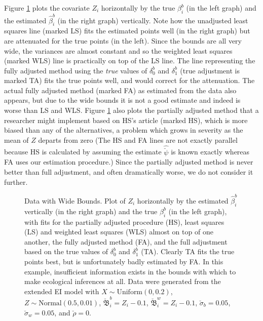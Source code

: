 \documentclass[11pt,titlepage]{article}
\newcommand{\bbeta}{{\mathfrak B}}
\newcommand{\sigmau}{\breve{\sigma}}
\newcommand{\rhou}{\breve{\rho}}
\newcommand{\psiu}{\breve{\psi}}
\begin{document}
Figure \ref{f:wide} plots the covariate $Z_i$ horizontally by the true
$\beta_i^b$ (in the left graph) and the estimated $\hat\beta_i^b$ (in
the right graph) vertically.  Note how the unadjusted least squares
line (marked LS) fits the estimated points well (in the right graph)
but are attenuated for the true points (in the left).  Since the
bounds are all very wide, the variances are almost constant and so the
weighted least squares (marked WLS) line is practically on top of the
LS line.  The line representing the fully adjusted method using the
\emph{true} values of $\delta_0^b$ and $\delta_1^b$ (true adjustment
is marked TA) fits the true points well, and would correct for the
attenuation.  The actual fully adjusted method (marked FA) as
estimated from the data also appears, but due to the wide bounds it is
not a good estimate and indeed is worse than LS and WLS.  Figure
\ref{f:wide} also plots the partially adjusted method that a
researcher might implement based on HS's article (marked HS), which is
more biased than any of the alternatives, a problem which grows in
severity as the mean of $Z$ departs from zero (The HS and FA lines are
not exactly parallel because HS is calculated by assuming the estimate
$\hat\psiu$ is known exactly whereas FA uses our estimation
procedure.)  Since the partially adjusted method is never better than
full adjustment, and often dramatically worse, we do not consider it
further.
\begin{figure}[t]
  \begin{center}
    \caption{Data with Wide Bounds. Plot of $Z_i$ horizontally by
      the estimated $\hat\beta_i^b$ vertically (in the right graph)
      and the true $\beta_i^b$ (in the left graph), with fits for the
      partially adjusted procedure (HS), least squares (LS) and
      weighted least squares (WLS) almost on top of one another, the
      fully adjusted method (FA), and the full adjustment based on the
      true values of $\delta_0^b$ and $\delta_1^b$ (TA).  Clearly TA
      fits the true points best, but is unfortunately badly estimated
      by FA.  In this example, insufficient information exists in the
      bounds with which to make ecological inferences at all.  Data
      were generated from the extended EI model with $X \sim
      \textrm{Uniform}(0,0.2)$, $Z \sim \textrm{Normal}(0.5,0.01)$,
      $\breve\bbeta_i^b = Z_i - 0.1$, $\breve\bbeta_i^w = Z_i - 0.1$,
      $\sigmau_b = 0.05$, $\sigmau_w = 0.05$, and $\rhou = 0$.}
    \label{f:wide}
  \end{center}
\end{figure}
\end{document}
